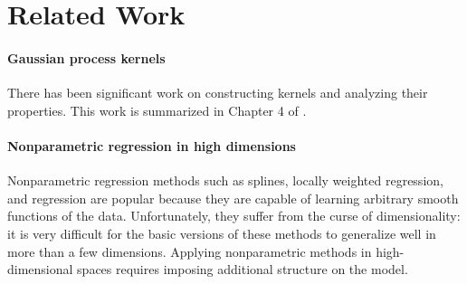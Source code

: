 \documentclass[twoside]{article}
\begin{document}




\section{Related Work}
\label{sec:related_work}


\paragraph{Gaussian process kernels} There has been significant work on constructing \gp{} kernels and analyzing their properties. This work is summarized in Chapter 4 of \cite{rasmussen38gaussian}. 

\paragraph{Nonparametric regression in high dimensions} Nonparametric regression methods such as splines, locally weighted regression, and \gp{} regression are popular because they are capable of learning arbitrary smooth functions of the data. Unfortunately, they suffer from the curse of dimensionality: it is very difficult for the basic versions of these methods to generalize well in more than a few dimensions. Applying nonparametric methods in high-dimensional spaces requires imposing additional structure on the model.
\end{document}
